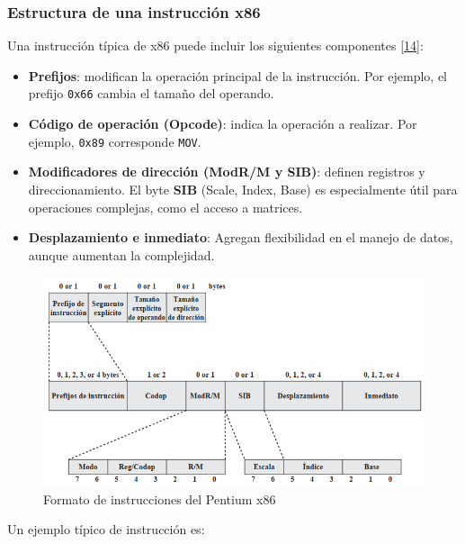 \documentclass[12pt,oneside]{templates/unerthesis}
\providecommand{\tightlist}{%
  \setlength{\itemsep}{0pt}\setlength{\parskip}{0pt}}
\begin{document}
\hypertarget{estructura-de-una-instrucciuxf3n-x86}{%
\subsubsection{Estructura de una instrucción x86}\label{estructura-de-una-instrucciuxf3n-x86}}

Una instrucción típica de x86 puede incluir los siguientes componentes \protect\hyperlink{ref-stallings_computer_2021}{{[}14{]}}:

\begin{itemize}
\tightlist
\item
  \textbf{Prefijos}: modifican la operación principal de la instrucción. Por ejemplo, el prefijo \texttt{0x66} cambia el tamaño del operando.
\item
  \textbf{Código de operación (Opcode)}: indica la operación a realizar. Por ejemplo, \texttt{0x89} corresponde \texttt{MOV}.
\item
  \textbf{Modificadores de dirección (ModR/M y SIB)}: definen registros y direccionamiento. El byte \textbf{SIB} (Scale, Index, Base) es especialmente útil para operaciones complejas, como el acceso a matrices.
\item
  \textbf{Desplazamiento e inmediato}: Agregan flexibilidad en el manejo de datos, aunque aumentan la complejidad.
\end{itemize}

\begin{figure}

{\centering \includegraphics[width=1\linewidth]{images/formatoinstruccionx86} 

}

\caption{Formato de instrucciones del Pentium x86}\label{fig:FormatoInst}
\end{figure}

Un ejemplo típico de instrucción es:
\end{document}
